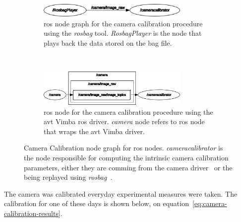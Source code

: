 \begin{figure}[H]
	\vspace{5mm}
	\centering
	\begin{subfigure}[c]{0.8\textwidth}
		\centering
		\includegraphics[width=0.8\textwidth]{img/camera-calibration/bag-rosgraph.png}
		\caption{\ac{ros} node graph for the camera calibration procedure using the \emph{rosbag} tool. \emph{RosbagPlayer} is the node that plays back the data stored on the bag file.}
		\label{fig:camera-calibration-bag-rosgraph}
	\end{subfigure}
	\vspace{5mm} \\ 
	\begin{subfigure}[c]{0.8\textwidth}
		\centering
		\includegraphics[width=0.8\textwidth]{img/camera-calibration/avt-rosgraph.png}		
		\caption{\ac{ros} node for the camera calibration procedure using the \ac{avt} Vimba \ac{ros} driver. \emph{camera} node refers to \ac{ros} node that wraps the \ac{avt} Vimba driver.}
		\label{fig:camera-calibration-avt-rosgraph}
	\end{subfigure}
	\caption{Camera Calibration node graph for \ac{ros} nodes. \emph{cameracalibrator} is the node responsible for computing the intrinsic camera calibration parameters, either they are comming from the camera driver~ or the being replayed using \emph{rosbag}~.}
	\label{fig:camera-calibration-rosgraph}
\end{figure}

The camera was calibrated everyday experimental measures were taken. The calibration for one of these days is shown below, on equation~\ref{eq:camera-calibration-results}.

